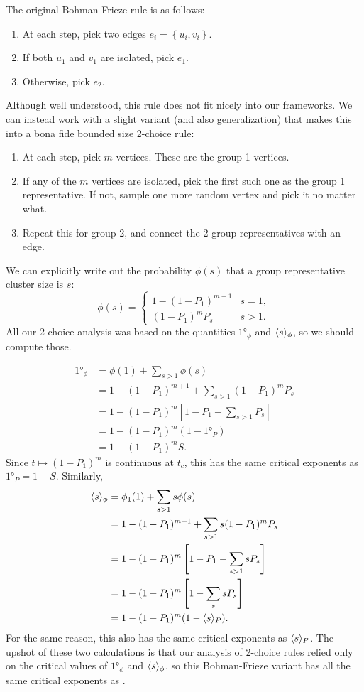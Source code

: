 \documentclass[twoside,10pt]{article}
\newcommand{\BF}{Bohman-Frieze\xspace}
\begin{document}
The original \BF rule is as follows:
\begin{enumerate}
	\item At each step, pick two edges $e_i = \left\{ u_i, v_i \right\}$.
	\item If both $u_1$ and $v_1$ are isolated, pick $e_1$.
	\item Otherwise, pick $e_2$.
\end{enumerate}
Although well understood, this rule does not fit nicely into our frameworks. We can instead work with a slight variant (and also generalization) that makes this into a bona fide bounded size 2-choice rule:
\begin{enumerate}
	\item At each step, pick $m$ vertices. These are the group 1 vertices.
	\item If any of the $m$ vertices are isolated, pick the first such one as the group 1 representative. If not, sample one more random vertex and pick it no matter what.
	\item Repeat this for group 2, and connect the 2 group representatives with an edge.
\end{enumerate}

We can explicitly write out the probability $\phi(s)$ that a group representative cluster size is $s$:
\[
	\phi(s)=
	\begin{cases}
		1 - (1-P_1)^{m+1} & s = 1, \\
		(1-P_1)^{m}P_s & s > 1.
	\end{cases}
\] 
All our 2-choice analysis was based on the quantities $\ang{1}_{\phi}$ and $\langle s \rangle_{\phi}$, so we should compute those.

\begin{align*}
	\ang{1}_{\phi} &= \phi(1) + \sum_{s > 1} \phi(s) \\
		       &= 1 - (1-P_1)^{m+1} + \sum_{s>1}(1-P_1)^{m}P_s \\
		       &= 1 - (1-P_1)^{m} \left[ 1 - P_1 - \sum_{s>1}P_s \right] \\
		       &= 1 - (1-P_1)^{m} (1-\ang{1}_{P}) \\
		       &= 1 - (1-P_1)^{m} S.
\end{align*}
Since $t \mapsto (1-P_1)^{m}$ is continuous at $t_c$, this has the same critical exponents as $\ang{1}_{P} = 1-S$. Similarly,
\begin{align*}
	\langle s \rangle_{\phi} &= \phi_1(1) + \sum_{s>1}s \phi(s) \\
		       &= 1 - (1-P_1)^{m+1} + \sum_{s>1} s(1-P_1)^{m}P_s \\
		       &= 1 - (1-P_1)^{m}\left[ 1-P_1-\sum_{s>1}sP_s \right] \\
		       &= 1 - (1-P_1)^{m}\left[ 1 - \sum_s sP_s \right] \\
		       &= 1 - (1-P_1)^{m}(1-\langle s \rangle_{P}).
\end{align*}
For the same reason, this also has the same critical exponents as $\langle s \rangle_{P}$. The upshot of these two calculations is that our analysis of 2-choice rules relied only on the critical values of $\ang{1}_{\phi}$ and $\langle s \rangle_{\phi}$, so this \BF variant has all the same critical exponents as \ER.
\end{document}
